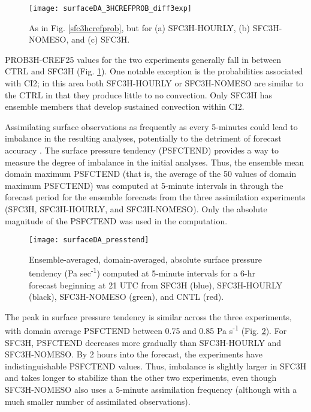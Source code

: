\begin{figure}
\centering
\texttt{[image: surfaceDA\_3HCREFPROB\_diff3exp]}
\caption{As in Fig. \ref{sfc3hcrefprob}, but for (a) SFC3H-HOURLY, (b) SFC3H-NOMESO, and (c) SFC3H.}
\label{3hcrefprob_diff3exp}
\end{figure}

PROB3H-CREF25 values for the two experiments generally fall in between CTRL and SFC3H (Fig. \ref{3hcrefprob_diff3exp}). One notable exception is the probabilities associated with CI2; in this area both SFC3H-HOURLY or SFC3H-NOMESO are similar to the CTRL in that they produce little to no convection. Only SFC3H has ensemble members that develop sustained convection within CI2.

Assimilating surface observations as frequently as every 5-minutes could lead to imbalance in the resulting analyses, potentially to the detriment of forecast accuracy \citep{greybushetal11}. The surface pressure tendency (PSFCTEND) provides a way to measure the degree of imbalance in the initial analyses. Thus, the ensemble mean domain maximum PSFCTEND (that is, the average of the 50 values of domain maximum PSFCTEND) was computed at 5-minute intervals in through the forecast period for the ensemble forecasts from the three assimilation experiments (SFC3H, SFC3H-HOURLY, and SFC3H-NOMESO). Only the absolute magnitude of the PSFCTEND was used in the computation.

\begin{figure}
\centering
\texttt{[image: surfaceDA\_presstend]}
\caption{Ensemble-averaged, domain-averaged, absolute surface pressure tendency (Pa sec\textsuperscript{-1}) computed at 5-minute intervals for a 6-hr forecast beginning at 21 UTC from SFC3H (blue), SFC3H-HOURLY (black), SFC3H-NOMESO (green), and CNTL (red).}
\label{sfcdapresstend}
\end{figure}

The peak in surface pressure tendency is similar across the three experiments, with domain average PSFCTEND between 0.75 and 0.85 Pa s\textsuperscript{-1} (Fig. \ref{sfcdapresstend}). For SFC3H, PSFCTEND decreases more gradually than SFC3H-HOURLY and SFC3H-NOMESO. By 2 hours into the forecast, the experiments have indistinguishable PSFCTEND values. Thus, imbalance is slightly larger in SFC3H and takes longer to stabilize than the other two experiments, even though SFC3H-NOMESO also uses a 5-minute assimilation frequency (although with a much smaller number of assimilated observations).

